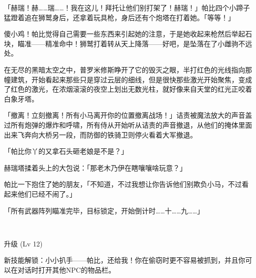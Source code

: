 「赫瑞！赫……瑞……！我在这儿！拜托让他们别打架了！赫瑞！」帕比四个小蹄子猛蹬着追在狮鹫身后，还拿着玩具枪，身后还有个炮塔在打着她。「等等！」

傻小鸡！帕比觉得自己需要一些东西来引起她的注意，于是她收起来枪然后举起石块，瞄准——精准命中！狮鹫打着转从天上降落——好吧，是坠落在了小雌驹不远处。

在无尽的黑暗太空之中，普罗米修斯睁开了它的毁灭之眼，半打红色的光线指向那幢建筑，开始看起来那些只是穿过云层的细线，但是很快那些激光开始聚焦，变成了红色的激光，在浓烟滚滚的夜空上划出无数光柱，就好像来自天堂的红光正咬着白象牙塔。

「撤离！立刻撤离！所有小马离开你的位置撤离战场！」诘责被魔法放大的声音盖过所有炮弹的爆炸和呼啸，所有侍从开始听从诘责的声音撤退，从他们的掩体里面出来飞奔向大桥另一段，而防御的铁骑卫则停火看着大军撤退。

「帕比你丫的又拿石头砸老娘是不是？」

赫瑞塔揉着头上的大包说：「那老木乃伊在瞎嚷嚷啥玩意？」

帕比一下抱住了她的朋友，「不知道，不过我想让你告诉他们别欺负小马，不过看起来他们已经不闹了。」

「{\mt 所有武器阵列瞄准完毕，目标锁定，开始倒计时……十……九……}」

~\vfill

\begin{note}
    升级 (Lv 12) 

    新技能解锁：小小扒手——帕比，还给我！你在偷窃时更不容易被抓到，并且你可以在对话时打开其他NPC的物品栏。
\end{note}



